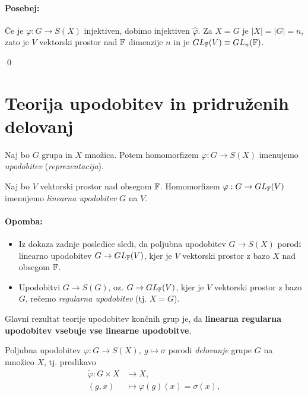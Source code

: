 \paragraph{Posebej:} \v Ce je $\varphi: G \to S(X)$ injektiven, dobimo injektiven $\hat{\varphi}$. Za $X = G$ je $|X| = |G| = n$, zato je $V$ vektorski
prostor nad $\mathbb{F}$ dimenzije $n$ in je $GL_{\mathbb{F}} (V) \equiv GL_n (\mathbb{F})$.

\qed

\section{Teorija upodobitev in pridru\v zenih delovanj}

\begin{defin}
	Naj bo $G$ grupa in $X$ mno\v zica. Potem homomorfizem $\varphi : G \to S(X)$ imenujemo \emph{upodobitev} (\emph{reprezentacija}).
\end{defin}

\begin{defin}
	Naj bo $V$ vektorski prostor nad obsegom $\mathbb{F}$. Homomorfizem $\varphi : G \to GL_{\mathbb{F}}(V)$ imenujemo \emph{linearna upodobitev} $G$ na $V$.
\end{defin}

\paragraph{Opomba:}
\begin{itemize}
	\item{Iz dokaza zadnje posledice sledi, da poljubna upodobitev $G \to S(X)$ porodi linearno upodobitev $G \to GL_{\mathbb{F}}(V)$, kjer je $V$
		vektorski prostor z bazo $X$ nad obsegom $\mathbb{F}$.}
	\item{Upodobitvi $G \to S(G)$, oz. $G \to GL_{\mathbb{F}}(V)$, kjer je $V$ vektorski prostor z bazo $G$, re\v cemo \emph{regularna upodobitev} (tj. $X = G$).}
\end{itemize}

\ni Glavni rezultat teorije upodobitev kon\v cnih grup je, da {\bf linearna regularna upodobitev vsebuje vse linearne upodobitve}.

Poljubna upodobitev $\varphi : G \to S(X),\ g \mapsto \sigma$ porodi \emph{delovanje} grupe $G$ na mno\v zico $X$, tj. preslikavo
\begin{align*}
	\tilde{\varphi}: G \times X &\to X, \\
	(g, x) &\mapsto \varphi(g)(x) = \sigma (x),
\end{align*}


